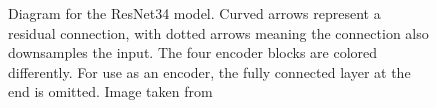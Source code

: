 \begin{figure}[htbp]
    \caption{Diagram for the ResNet34 model. Curved arrows represent a residual connection, with dotted arrows meaning the connection also downsamples the input. The four encoder blocks are colored differently. For use as an encoder, the fully connected layer at the end is omitted. Image taken from \cite{heDeepResidualLearning2015}}
    \label{fig:resnet34}
\end{figure}